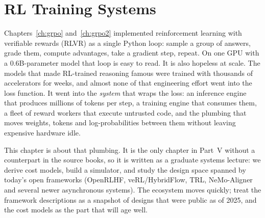 \chapter{RL Training Systems}\label{ch:rlsys}

Chapters~\ref{ch:grpo} and~\ref{ch:grpo2} implemented reinforcement learning with verifiable
rewards (RLVR) as a single Python loop: sample a group of answers, grade them, compute
advantages, take a gradient step, repeat. On one GPU with a 0.6B-parameter model that loop is
easy to read. It is also hopeless at scale. The models that made RL-trained reasoning famous
were trained with thousands of accelerators for weeks, and almost none of that engineering
effort went into the loss function. It went into the \emph{system} that wraps the loss: an
inference engine that produces millions of tokens per step, a training engine that consumes
them, a fleet of reward workers that execute untrusted code, and the plumbing that moves
weights, tokens and log-probabilities between them without leaving expensive hardware idle.

This chapter is about that plumbing. It is the only chapter in Part~V without a counterpart in
the source books, so it is written as a graduate systems lecture: we derive cost models, build
a simulator, and study the design space spanned by today's open frameworks (OpenRLHF,
veRL/HybridFlow, TRL, NeMo-Aligner and several newer asynchronous systems). The ecosystem moves
quickly; treat the framework descriptions as a snapshot of designs that were public as of 2025,
and the cost models as the part that will age well.

